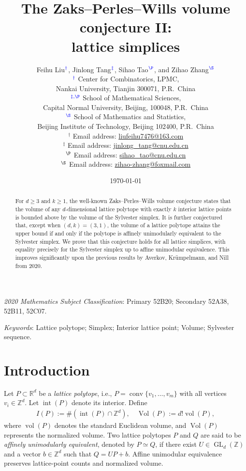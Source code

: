 \documentclass[reqno, 11pt]{article}
\title{The Zaks--Perles--Wills volume conjecture II:\\ lattice simplices}
\author{Feihu Liu$^{\color{blue} \dag}$, Jinlong Tang$^{\color{blue} \ddag}$, Sihao Tao$^{\color{blue} \P}$, and Zihao Zhang$^{\color{blue} \S}$
\\[2mm]
{\small $^{\color{blue} \dag}$ Center for Combinatorics, LPMC,}\\[-0.8ex]
{\small Nankai University, Tianjin 300071, P.R.~China}\\
{\small $^{\color{blue} \ddag, \P}$ School of Mathematical Sciences,}\\[-0.8ex]
{\small Capital Normal University, Beijing, 100048, P.R.~China}\\
{\small $^{\color{blue} \S}$ School of Mathematics and Statistics,}\\[-0.8ex]
{\small Beijing Institute of Technology, Beijing 102400, P.R.~China}\\
{\small {\color{blue} $^\dag$} Email address: \url{liufeihu7476@163.com}}\\
{\small {\color{blue} $^\ddag$} Email address: \url{jinlong\_tang@cnu.edu.cn}}\\
{\small {\color{blue} $^\P$} Email address: \url{sihao\_tao@cnu.edu.cn}}\\
{\small {\color{blue} $^\S$} Email address: \url{zihao-zhang@foxmail.com}}\\
}
\date{\today}
\numberwithin{equation}{section}
\theoremstyle{definition}
\begin{document}
\maketitle

\begin{abstract}
For $d\geq 3$ and $k\geq 1$, the well-known Zaks--Perles--Wills volume conjecture states that the volume of any $d$-dimensional lattice polytope with exactly $k$ interior lattice points is bounded above by the volume of the Sylvester simplex.
It is further conjectured that, except when $(d,k)=(3,1)$, the volume of a lattice polytope attains the upper bound if and only if the polytope is affinely unimodularly equivalent to the Sylvester simplex. We prove that this conjecture holds for all lattice simplices, with equality precisely for the Sylvester simplex up to affine unimodular equivalence.
This improves significantly upon the previous results by Averkov, Kr\"umpelmann, and Nill from 2020.
\end{abstract}

\noindent
\begin{small}
\emph{2020 Mathematics Subject Classification}: Primary 52B20;
Secondary 52A38, 52B11, 52C07.
\end{small}

\noindent
\begin{small}
\emph{Keywords}: Lattice polytope; Simplex; Interior lattice point;
Volume; Sylvester sequence.
\end{small}


\section{Introduction}\label{sec:introduction}

Let $P\subset\mathbb R^d$ be a \emph{lattice polytope}, i.e., $P=\operatorname{conv}\{v_1,\ldots,v_m\}$ with all vertices
$v_i\in\mathbb Z^d$. Let $\operatorname{int}(P)$ denote its interior.
Define
\begin{align*}
 I(P):=\#(\operatorname{int}(P)\cap\mathbb Z^d),\quad
 \operatorname{Vol}(P):=d!\operatorname{vol}(P),
\end{align*}
where $\operatorname{vol}(P)$ denotes the standard Euclidean volume,
and $\operatorname{Vol}(P)$ represents the normalized volume.
Two lattice polytopes $P$ and $Q$ are said to be \emph{affinely
unimodularly equivalent}, denoted by $P\simeq Q$, if there exist
$U\in\operatorname{GL}_d(\mathbb Z)$ and a vector $b\in\mathbb Z^d$
such that $Q=UP+b$.
Affine unimodular equivalence preserves lattice-point counts and
normalized volume.
\end{document}
